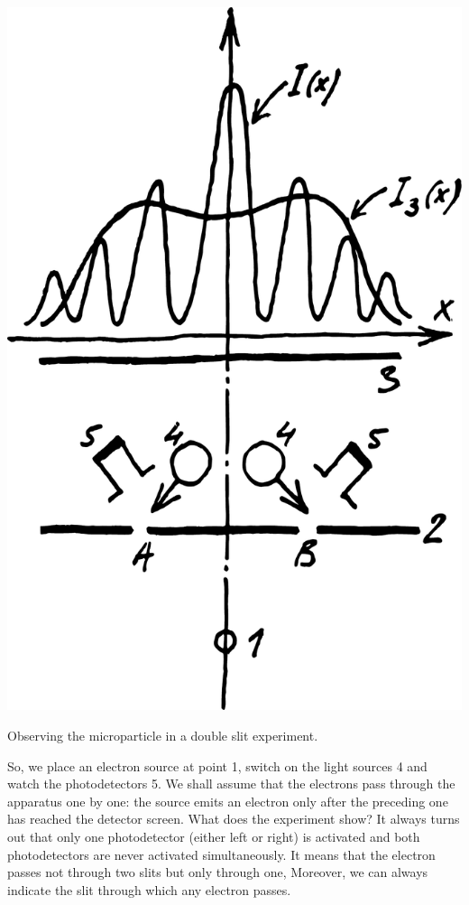 \documentclass[a4paper,sfsidenotes,colorlinks=true]{tufte-book}
\numberwithin{equation}{section}
\numberwithin{figure}{section}
\begin{document}
\begin{marginfigure}[1cm]
\centering
\includegraphics[width=\textwidth]{figures/fig-07-03.pdf}
\caption{Observing the microparticle in a double slit experiment.}
\label{fig-7.3}
\end{marginfigure}


So, we place an electron source at point \textsf{1}, switch on the light sources \textsf{4} and watch the photodetectors \textsf{5}.
We shall assume that the electrons pass through the apparatus one by one: the source emits an electron only after the preceding one has reached the detector screen. What does the experiment show? It always turns out that only one photodetector (either left or right) is activated and both photodetectors are never activated simultaneously. It means that the electron passes not through two slits but only through one, Moreover, we can always indicate the slit through which any electron passes.
\end{document}
